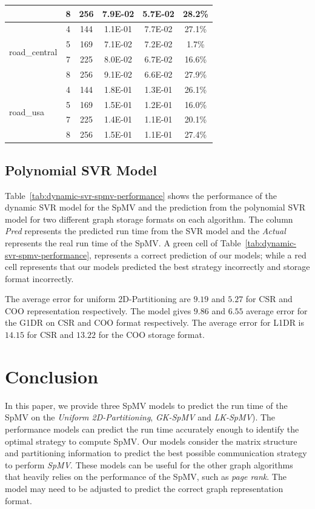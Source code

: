 \documentclass[conference, 10ppt]{IEEEtran}
\begin{document}
\begin{table}[htb]
\begin{tabular}[c]{| l | c | c | c | c | c |}
  &  8  &  256  &  7.9E-02  &  5.7E-02  &  28.2\% \\ \hline
\multirow{4}{*}{road\_central}  &  4  &  144  &  1.1E-01  &  7.7E-02  &  27.1\% \\ \cline{2-6}
  &  5  &  169  &  7.1E-02  &  7.2E-02  &  1.7\% \\ \cline{2-6}
  &  7  &  225  &  8.0E-02  &  6.7E-02  &  16.6\% \\ \cline{2-6}
  &  8  &  256  &  9.1E-02  &  6.6E-02  &  27.9\% \\ \hline
\multirow{4}{*}{road\_usa}  &  4  &  144  &  1.8E-01  &  1.3E-01  &  26.1\% \\ \cline{2-6}
  &  5  &  169  &  1.5E-01  &  1.2E-01  &  16.0\% \\ \cline{2-6}
  &  7  &  225  &  1.4E-01  &  1.1E-01  &  20.1\% \\ \cline{2-6}
  &  8  &  256  &  1.5E-01  &  1.1E-01  &  27.4\% \\ \hline
\end{tabular}
\end{table}

\subsection{Polynomial SVR Model}
Table~\ref{tab:dynamic-svr-spmv-performance} shows the performance of the dynamic SVR model for the SpMV 
and the prediction from the polynomial SVR model for two different
graph storage formats on each algorithm. The column \textit{Pred}
represents the predicted run time from the SVR model and the
\textit{Actual} represents the real run time of the SpMV. A green cell of  
Table~\ref{tab:dynamic-svr-spmv-performance}, represents a correct prediction of our
models; while a red cell represents that our models predicted the best
strategy incorrectly and storage format incorrectly. 

The average error for uniform 2D-Partitioning are $9.19$ and $5.27$ for
CSR and COO representation respectively.  The model gives $9.86$ and
$6.55$ average error for the G1DR on CSR and COO format
respectively. The average error for L1DR is $14.15$ for CSR and $13.22$
for the COO storage format.


\section{Conclusion}
In this paper, we provide three SpMV models to predict the run time of the
SpMV on the \textit{Uniform 2D-Partitioning}, \textit{GK-SpMV} and \textit{LK-SpMV}). 
The performance models can predict the run time accurately enough to identify the
optimal strategy to compute SpMV. Our models consider the matrix structure and partitioning information to 
predict the best possible communication strategy to perform
\textit{SpMV}. These models can be useful for the other graph
algorithms that heavily relies on the performance of the SpMV, such as
\textit{page rank}. The model may need to be adjusted to predict the
correct graph representation format.
\end{document}
